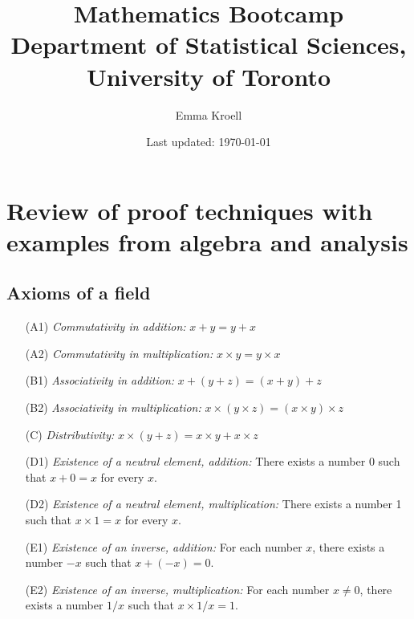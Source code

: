 \documentclass{article}
\title{Mathematics Bootcamp \\
\vspace{0.5em}
\large Department of Statistical Sciences, University of Toronto}
\author{Emma Kroell}
\date{Last updated: \today}
\begin{document}
\maketitle
\tableofcontents

\newpage
\section{Review of proof techniques with examples from algebra and analysis}
\subsection{Axioms of a field}
\begin{enumerate}
\setlength\itemsep{0.1em}
    \item[(A1)] \textit{Commutativity in addition:} $x + y = y + x$
    \item[(A2)] \textit{Commutativity in multiplication:} $x \times y = y \times x$
    \item[(B1)] \textit{Associativity in addition:} $x + (y + z) = (x + y) + z$ 
    \item[(B2)] \textit{Associativity in multiplication:} $x \times (y\times z) = (x\times y) \times z$ 
    \item[(C)] \textit{Distributivity:} $x \times (y + z) = x \times y + x \times z$
    \item[(D1)]\textit{Existence of a neutral element, addition:} There exists a number 0 such that $x + 0 = x$ for every $x$.
    \item[(D2)] \textit{Existence of a neutral element, multiplication:} There exists a number 1 such that $x \times 1 = x$ for every $x$. 
    \item[(E1)]\textit{Existence of an inverse, addition:} For each number $x$, there exists a number $-x$ such that $x + (-x) = 0$.
     \item[(E2)]\textit{Existence of an inverse, multiplication:} For each number $x \neq 0$, there exists a number $1/x$ such that $x \times 1/x = 1$.
\end{enumerate}

%
\end{document}
